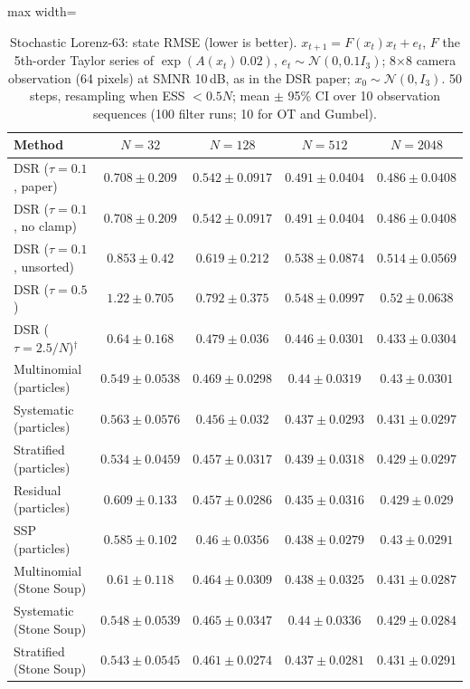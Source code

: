 \begin{table}[H]
\centering
\small
\caption{Stochastic Lorenz-63: state RMSE (lower is better). $x_{t+1}=F(x_t)x_t+e_t$, $F$ the 5th-order Taylor series of $\exp(A(x_t)\,0.02)$, $e_t\sim\mathcal N(0,0.1I_3)$; 8$\times$8 camera observation (64 pixels) at SMNR 10\,dB, as in the DSR paper; $x_0\sim\mathcal N(0,I_3)$. 50 steps, resampling when ESS $<0.5N$; mean $\pm$ 95\% CI over 10 observation sequences (100 filter runs; 10 for OT and Gumbel).}
\label{tab:lorenz63-rmse}
\begin{adjustbox}{max width=\linewidth}
\begin{tabular}{lcccc}
\toprule
Method & $N{=}32$ & $N{=}128$ & $N{=}512$ & $N{=}2048$ \\
\midrule
DSR ($\tau{=}0.1$, paper) & $0.708\pm0.209$ & $0.542\pm0.0917$ & $0.491\pm0.0404$ & $0.486\pm0.0408$ \\
DSR ($\tau{=}0.1$, no clamp) & $0.708\pm0.209$ & $0.542\pm0.0917$ & $0.491\pm0.0404$ & $0.486\pm0.0408$ \\
DSR ($\tau{=}0.1$, unsorted) & $0.853\pm0.42$ & $0.619\pm0.212$ & $0.538\pm0.0874$ & $0.514\pm0.0569$ \\
DSR ($\tau{=}0.5$) & $1.22\pm0.705$ & $0.792\pm0.375$ & $0.548\pm0.0997$ & $0.52\pm0.0638$ \\
DSR ($\tau{=}2.5/N$)$^\dagger$ & $0.64\pm0.168$ & $0.479\pm0.036$ & $0.446\pm0.0301$ & $0.433\pm0.0304$ \\
\midrule
Multinomial (particles) & $0.549\pm0.0538$ & $0.469\pm0.0298$ & $0.44\pm0.0319$ & $0.43\pm0.0301$ \\
Systematic (particles) & $0.563\pm0.0576$ & $0.456\pm0.032$ & $0.437\pm0.0293$ & $0.431\pm0.0297$ \\
Stratified (particles) & $0.534\pm0.0459$ & $0.457\pm0.0317$ & $0.439\pm0.0318$ & $0.429\pm0.0297$ \\
Residual (particles) & $0.609\pm0.133$ & $0.457\pm0.0286$ & $\mathbf{0.435\pm0.0316}$ & $0.429\pm0.029$ \\
SSP (particles) & $0.585\pm0.102$ & $0.46\pm0.0356$ & $0.438\pm0.0279$ & $0.43\pm0.0291$ \\
Multinomial (Stone Soup) & $0.61\pm0.118$ & $0.464\pm0.0309$ & $0.438\pm0.0325$ & $0.431\pm0.0287$ \\
Systematic (Stone Soup) & $0.548\pm0.0539$ & $0.465\pm0.0347$ & $0.44\pm0.0336$ & $\mathbf{0.429\pm0.0284}$ \\
Stratified (Stone Soup) & $0.543\pm0.0545$ & $0.461\pm0.0274$ & $0.437\pm0.0281$ & $0.431\pm0.0291$ \\

\end{tabular}
\end{adjustbox}
\end{table}

